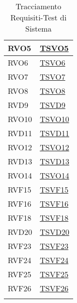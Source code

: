 \begin{longtable}[ht]{|>{\centering}m{5cm}|m{5cm}<{\centering}|}
RVO5 & \hyperlink{TVVO5}{TSVO5}\\ \hline
RVO6 & \hyperlink{TVVO6}{TSVO6}\\ \hline
RVO7 & \hyperlink{TVVO7}{TSVO7}\\ \hline
RVO8 & \hyperlink{TVVO8}{TSVO8}\\ \hline
RVD9 & \hyperlink{TVVD9}{TSVD9}\\ \hline
RVO10 & \hyperlink{TVVO10}{TSVO10}\\ \hline
RVD11 & \hyperlink{TVVD11}{TSVD11}\\ \hline
RVO12 & \hyperlink{TVVO12}{TSVO12}\\ \hline
RVD13 & \hyperlink{TVVD13}{TSVD13}\\ \hline
RVO14 & \hyperlink{TVVO14}{TSVO14}\\ \hline
RVF15 & \hyperlink{TVVF15}{TSVF15}\\ \hline
RVF16 & \hyperlink{TVVF16}{TSVF16}\\ \hline
RVF18 & \hyperlink{TVVF18}{TSVF18}\\ \hline
RVD20 & \hyperlink{TVVD20}{TSVD20}\\ \hline
RVF23 & \hyperlink{TVVF23}{TSVF23}\\ \hline
RVF24 & \hyperlink{TVVF24}{TSVF24}\\ \hline
RVF25 & \hyperlink{TVVF25}{TSVF25}\\ \hline
RVF26 & \hyperlink{TVVF26}{TSVF26}\\ \hline
\caption[Tracciamento Requisiti-Test di Sistema]{Tracciamento Requisiti-Test di Sistema}
\label{tabella:requi-tv}
\end{longtable}
\clearpage
\FloatBarrier


